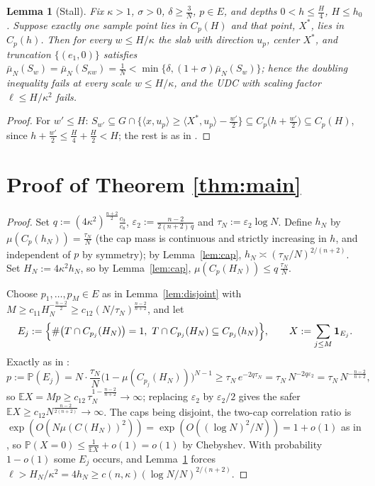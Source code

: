 \documentclass[11pt]{article}
\newtheorem{lemma}[theorem]{Lemma}
\newcommand{\E}{\mathbb{E}}
\newcommand{\PP}{\mathbb{P}}
\newcommand{\emp}{\bar\mu_N}
\begin{document}
\begin{lemma}[Stall]\label{lem:stall}
Fix $\kappa>1$, $\sigma>0$, $\delta\ge\frac3N$, $p\in E$, and depths
$0<h\le\frac H4$, $H\le h_0$.  Suppose exactly one sample point lies in
$C_p(H)$ and that point, $X^*$, lies in $C_p(h)$.  Then for every
$w\le H/\kappa$ the slab with direction $u_p$, center $X^*$, and truncation
$\{(e_1,0)\}$ satisfies
$\emp(S_w)=\emp(S_{\kappa w})=\frac1N<\min\{\delta,(1+\sigma)\emp(S_w)\}$;
hence the doubling inequality fails at every scale $w\le H/\kappa$, and the
UDC with scaling factor $\ell\le H/\kappa^2$ fails.
\end{lemma}

\begin{proof}
For $w'\le H$:
$S_{w'}\subseteq G\cap\{\langle x,u_p\rangle\ge\langle X^*,u_p\rangle
-\frac{w'}2\}\subseteq C_p\bigl(h+\frac{w'}2\bigr)\subseteq C_p(H)$, since
$h+\frac{w'}2\le\frac H4+\frac H2<H$; the rest is as in
\cite{companion4,companion5}.
\end{proof}

\section{Proof of Theorem \ref{thm:main}}\label{sec:proof}

\begin{proof}
Set $q:=(4\kappa^2)^{\frac{n+2}2}\frac{c_9}{c_8}$,
$\varepsilon_2:=\frac{n-2}{2(n+2)\,q}$ and $\tau_N:=\varepsilon_2\log N$.
Define $h_N$ by $\mu(C_p(h_N))=\frac{\tau_N}N$ (the cap mass is continuous and
strictly increasing in $h$, and independent of $p$ by symmetry); by
Lemma~\ref{lem:cap}, $h_N\asymp(\tau_N/N)^{2/(n+2)}$.  Set
$H_N:=4\kappa^2h_N$, so by Lemma~\ref{lem:cap},
$\mu(C_p(H_N))\le q\,\frac{\tau_N}N$.

Choose $p_1,\dots,p_M\in E$ as in Lemma~\ref{lem:disjoint} with
$M\ge c_{11}H_N^{-\frac{n-2}2}\ge c_{12}(N/\tau_N)^{\frac{n-2}{n+2}}$, and let
\[
E_j:=\Bigl\{\#\bigl(T\cap C_{p_j}(H_N)\bigr)=1,\
T\cap C_{p_j}(H_N)\subseteq C_{p_j}(h_N)\Bigr\},
\qquad
X:=\sum_{j\le M}\mathbf1_{E_j}.
\]
Exactly as in \cite{companion4}:
\[
p:=\PP(E_j)=N\cdot\frac{\tau_N}N\bigl(1-\mu(C_{p_j}(H_N))\bigr)^{N-1}
\ge\tau_N\,e^{-2q\tau_N}=\tau_N\,N^{-2q\varepsilon_2}
=\tau_N\,N^{-\frac{n-2}{n+2}},
\]
so $\E X=Mp\ge c_{12}\,\tau_N^{1-\frac{n-2}{n+2}}\to\infty$; replacing
$\varepsilon_2$ by $\varepsilon_2/2$ gives the safer
$\E X\ge c_{12}N^{\frac{n-2}{2(n+2)}}\to\infty$.  The caps being disjoint, the
two-cap correlation ratio is
$\exp(O(N\mu(C(H_N))^2))=\exp(O((\log N)^2/N))=1+o(1)$ as in
\cite{companion4}, so $\PP(X=0)\le\frac1{\E X}+o(1)=o(1)$ by Chebyshev.
With probability $1-o(1)$ some $E_j$ occurs, and Lemma~\ref{lem:stall} forces
$\ell>H_N/\kappa^2=4h_N\ge c(n,\kappa)(\log N/N)^{2/(n+2)}$.
\end{proof}
\end{document}
